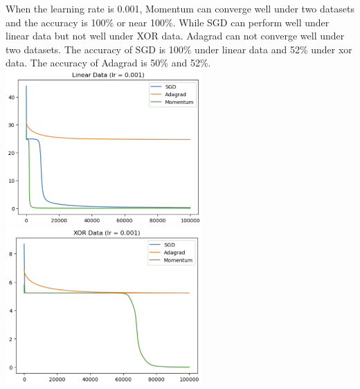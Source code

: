 \documentclass{article} %
\begin{document}
    When the learning rate is 0.001, Momentum can converge well under two datasets and the accuracy is 100\% or near 100\%.
    While SGD can perform well under linear data but not well under XOR data. Adagrad can not converge well under two datasets. 
    The accuracy of SGD is 100\% under linear data and 52\% under xor data. 
    The accuracy of Adagrad is 50\% and 52\%. \\
    \includegraphics[width=7.5cm]{./imgs/linear_opt_0001.png}
    \includegraphics[width=7.5cm]{./imgs/xor_opt_0001.png}
\end{document}
